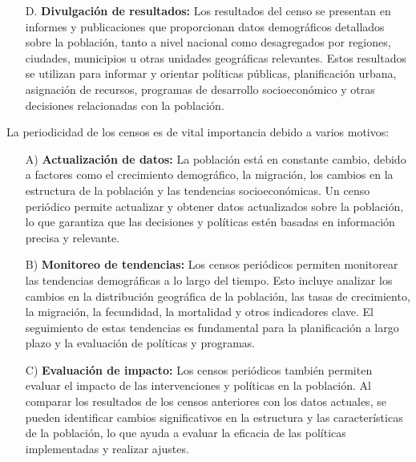 \documentclass[8pt,a4paper]{beamer}
\begin{document}
{\begin{frame}{}
\begin{block}{}
\begin{enumerate}
\item[D.] \textbf{Divulgación de resultados:} Los resultados del censo se presentan en informes y publicaciones que proporcionan datos demográficos detallados sobre la población, tanto a nivel nacional como desagregados por regiones, ciudades, municipios u otras unidades geográficas relevantes. Estos resultados se utilizan para informar y orientar políticas públicas, planificación urbana, asignación de recursos, programas de desarrollo socioeconómico y otras decisiones relacionadas con la población.
\end{enumerate}
La periodicidad de los censos es de vital importancia debido a varios motivos:
\begin{enumerate}
\justifying
\item[A)] \textbf{Actualización de datos:} La población está en constante cambio, debido a factores como el crecimiento demográfico, la migración, los cambios en la estructura de la población y las tendencias socioeconómicas. Un censo periódico permite actualizar y obtener datos actualizados sobre la población, lo que garantiza que las decisiones y políticas estén basadas en información precisa y relevante.
\end{enumerate}
\end{block}
\end{frame}

\begin{frame}
\begin{block}{}

\begin{enumerate}
\justifying
\item[B)] \textbf{Monitoreo de tendencias:} Los censos periódicos permiten monitorear las tendencias demográficas a lo largo del tiempo. Esto incluye analizar los cambios en la distribución geográfica de la población, las tasas de crecimiento, la migración, la fecundidad, la mortalidad y otros indicadores clave. El seguimiento de estas tendencias es fundamental para la planificación a largo plazo y la evaluación de políticas y programas.

\item[C)] \textbf{Evaluación de impacto:} Los censos periódicos también permiten evaluar el impacto de las intervenciones y políticas en la población. Al comparar los resultados de los censos anteriores con los datos actuales, se pueden identificar cambios significativos en la estructura y las características de la población, lo que ayuda a evaluar la eficacia de las políticas implementadas y realizar ajustes.


\end{enumerate}
\end{block}
\end{frame}}
\end{document}
